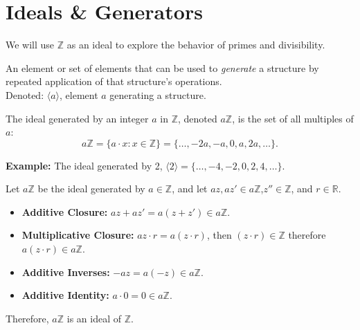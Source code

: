 \newpage

\section{Ideals \& Generators}
We will use $\mathbb{Z}$ as an ideal to explore the behavior of primes and divisibility.

\begin{Def}[Generator]

    An element or set of elements that can be used to \textit{generate} a structure by repeated application of that structure's operations.\\

    \noindent
    Denoted: $\langle a \rangle$, element $a$ generating a structure.
\end{Def}


\begin{Def}

    The ideal generated by an integer \( a \) in \( \mathbb{Z} \), denoted $a\mathbb{Z}$, is the set of all multiples of \( a \):
    \begin{equation*}
        a\mathbb{Z} = \{ a \cdot x : x \in \mathbb{Z} \}= \{ \ldots, -2a, -a, 0, a, 2a, \ldots \}.
    \end{equation*}
\end{Def}

\noindent
\textbf{Example:} The ideal generated by 2, $\langle 2 \rangle=\{\ldots,-4,-2,0,2,4,\ldots\}$.

\begin{Proof}

    Let $a\mathbb{Z}$ be the ideal generated by $a \in \mathbb{Z}$, and let $az, az' \in a\mathbb{Z}$,$z'' \in \mathbb{Z}$, and $r \in \mathbb{R}$.
    \begin{itemize}
        \item \textbf{Additive Closure:} $az + az' = a(z + z') \in a\mathbb{Z}$.
        \item \textbf{Multiplicative Closure:} $az \cdot r = a(z \cdot r)$, then $(z\cdot r)\in\mathbb{Z}$ therefore $a(z \cdot r)\in a\mathbb{Z}$.
        \item \textbf{Additive Inverses:} $-az = a(-z) \in a\mathbb{Z}$.
        \item \textbf{Additive Identity:} $a \cdot 0 = 0 \in a\mathbb{Z}$.

    \end{itemize}
    Therefore, $a\mathbb{Z}$ is an ideal of $\mathbb{Z}$.
\end{Proof}


